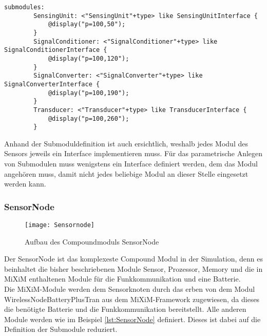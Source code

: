 \begin{minipage}{\textwidth}
\begin{lstlisting}[language=ned,caption={AbstractSensor},label=lst:AbstractSensor]
submodules:
        SensingUnit: <"SensingUnit"+type> like SensingUnitInterface {
            @display("p=100,50");
        }
        SignalConditioner: <"SignalConditioner"+type> like SignalConditionerInterface {
            @display("p=100,120");
        }
        SignalConverter: <"SignalConverter"+type> like SignalConverterInterface {
            @display("p=100,190");
        }
        Transducer: <"Transducer"+type> like TransducerInterface {
            @display("p=100,260");
        }
\end{lstlisting}
\end{minipage}

Anhand der Submoduldefinition ist auch ersichtlich, weshalb jedes Modul des Sensors jeweils ein Interface implementieren muss. Für das parametrische Anlegen von Submodulen muss wenigstens ein Interface definiert werden, dem das Modul angehören muss, damit nicht jedes beliebige Modul an dieser Stelle eingesetzt werden kann.

\subsubsection{SensorNode}

\begin{figure}[htbp]
\centering
\caption{Aufbau des Compoundmoduls SensorNode}
\label{fig:Sensornode}
\texttt{[image: Sensornode]}
\end{figure}

Der SensorNode ist das komplexeste Compound Modul in der Simulation, denn es beinhaltet die bisher beschriebenen Module Sensor, Prozessor, Memory und die in MiXiM enthaltenen Module für die Funkkommunikation und eine Batterie.\\
Die MiXiM-Module werden dem Sensorknoten durch das erben von dem Modul WirelessNodeBatteryPlusTran aus dem MiXiM-Framework zugewiesen, da dieses die benötigte Batterie und die Funkkommunikation bereitstellt. Alle anderen Module werden wie im Beispiel \ref{lst:SensorNode} definiert. Dieses ist dabei auf die Definition der Submodule reduziert.

